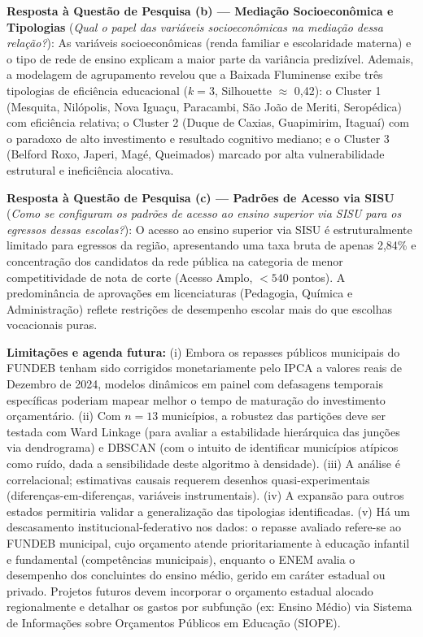 \documentclass[12pt]{article}
\begin{document}
\textbf{Resposta à Questão de Pesquisa (b) --- Mediação Socioeconômica e Tipologias} (\textit{Qual o papel das variáveis socioeconômicas na mediação dessa relação?}): As variáveis socioeconômicas (renda familiar e escolaridade materna) e o tipo de rede de ensino explicam a maior parte da variância predizível. Ademais, a modelagem de agrupamento revelou que a Baixada Fluminense exibe três tipologias de eficiência educacional ($k=3$, Silhouette $\approx$ 0,42): o Cluster 1 (Mesquita, Nilópolis, Nova Iguaçu, Paracambi, São João de Meriti, Seropédica) com eficiência relativa; o Cluster 2 (Duque de Caxias, Guapimirim, Itaguaí) com o paradoxo de alto investimento e resultado cognitivo mediano; e o Cluster 3 (Belford Roxo, Japeri, Magé, Queimados) marcado por alta vulnerabilidade estrutural e ineficiência alocativa.

\textbf{Resposta à Questão de Pesquisa (c) --- Padrões de Acesso via SISU} (\textit{Como se configuram os padrões de acesso ao ensino superior via SISU para os egressos dessas escolas?}): O acesso ao ensino superior via SISU é estruturalmente limitado para egressos da região, apresentando uma taxa bruta de apenas 2,84\% e concentração dos candidatos da rede pública na categoria de menor competitividade de nota de corte (Acesso Amplo, $<540$ pontos). A predominância de aprovações em licenciaturas (Pedagogia, Química e Administração) reflete restrições de desempenho escolar mais do que escolhas vocacionais puras.

\textbf{Limitações e agenda futura:} (i) Embora os repasses públicos municipais do FUNDEB
tenham sido corrigidos monetariamente pelo IPCA a valores reais de Dezembro de 2024,
modelos dinâmicos em painel com defasagens temporais específicas poderiam mapear melhor
o tempo de maturação do investimento orçamentário. (ii) Com $n=13$ municípios, a robustez das partições deve ser
testada com Ward Linkage (para avaliar a estabilidade hierárquica das junções via dendrograma) e DBSCAN (com o intuito de identificar municípios atípicos como ruído, dada a sensibilidade deste algoritmo à densidade). (iii) A análise é correlacional; estimativas
causais requerem desenhos quasi-experimentais (diferenças-em-diferenças, variáveis
instrumentais). (iv) A expansão para outros estados permitiria validar a generalização
das tipologias identificadas. (v) Há um descasamento institucional-federativo nos dados: o repasse avaliado refere-se ao FUNDEB municipal, cujo orçamento atende prioritariamente à educação infantil e fundamental (competências municipais), enquanto o ENEM avalia o desempenho dos concluintes do ensino médio, gerido em caráter estadual ou privado. Projetos futuros devem incorporar o orçamento estadual alocado regionalmente e detalhar os gastos por subfunção (ex: Ensino Médio) via Sistema de Informações sobre Orçamentos Públicos em Educação (SIOPE).

\clearpage


\end{document}
